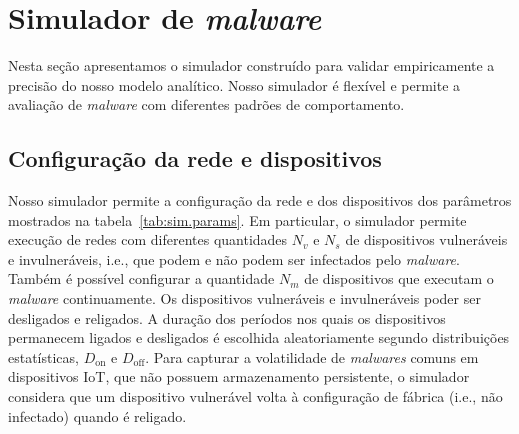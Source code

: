 \section{Simulador de \emph{malware}}
\label{sec:sim}

Nesta seção apresentamos o simulador construído para validar
empiricamente a precisão do nosso modelo analítico.  Nosso simulador
é flexível e permite a avaliação de \emph{malware} com diferentes
padrões de comportamento.

\subsection{Configuração da rede e dispositivos}

Nosso simulador permite a configuração da rede e dos dispositivos
dos parâmetros mostrados na tabela~\ref{tab:sim.params}.  Em
particular, o simulador permite execução de redes com diferentes
quantidades $N_v$ e $N_s$ de dispositivos vulneráveis
e invulneráveis, i.e., que podem e não podem ser infectados pelo
\emph{malware}.  Também é possível configurar a quantidade $N_m$ de
dispositivos que executam o \emph{malware} continuamente.  Os
dispositivos vulneráveis e invulneráveis poder ser desligados
e religados.  A duração dos períodos nos quais os dispositivos
permanecem ligados e desligados é escolhida aleatoriamente segundo
distribuições estatísticas, $D_\textrm{on}$ e $D_\textrm{off}$.
Para capturar a volatilidade de \emph{malwares} comuns em
dispositivos IoT, que não possuem armazenamento persistente,
o simulador considera que um dispositivo vulnerável volta
à configuração de fábrica (i.e., não infectado) quando é religado.

